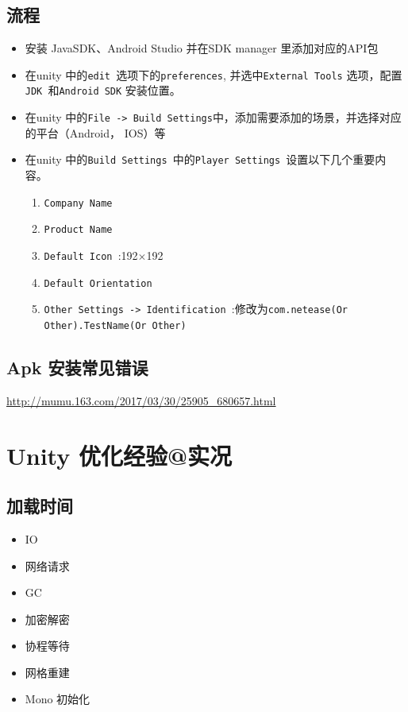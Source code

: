 \documentclass[UTF8,a4paper,12pt]{ctexbook}
\begin{document}
	\section{流程}
		\begin{itemize}
			\item 安装 JavaSDK、Android Studio 并在SDK manager 里添加对应的API包
			\item 在unity 中的\verb|edit |选项下的\verb|preferences|, 并选中\verb|External Tools| 选项，配置\verb|JDK |和\verb|Android SDK| 安装位置。
			\item 在unity 中的\verb|File -> Build Settings|中，添加需要添加的场景，并选择对应的平台（Android， IOS）等
			\item 在unity 中的\verb|Build Settings |中的\verb|Player Settings |设置以下几个重要内容。
				\begin{enumerate}
					\item \verb|Company Name |
					\item \verb|Product Name |
					\item \verb|Default Icon |:192$\times$192
					\item \verb|Default Orientation |
					\item \verb|Other Settings -> Identification |:修改为\verb|com.netease(Or Other).TestName(Or Other)|
				\end{enumerate}
		\end{itemize}	
	
	\section{Apk 安装常见错误}
		\url{http://mumu.163.com/2017/03/30/25905_680657.html}




\chapter{Unity 优化经验@实况}
	\section{加载时间}
		\begin{itemize}
			\item IO
			\item 网络请求
			\item GC
			\item 加密解密
			\item 协程等待
			\item 网格重建
			\item Mono 初始化
		\end{itemize}
	
\end{document}
